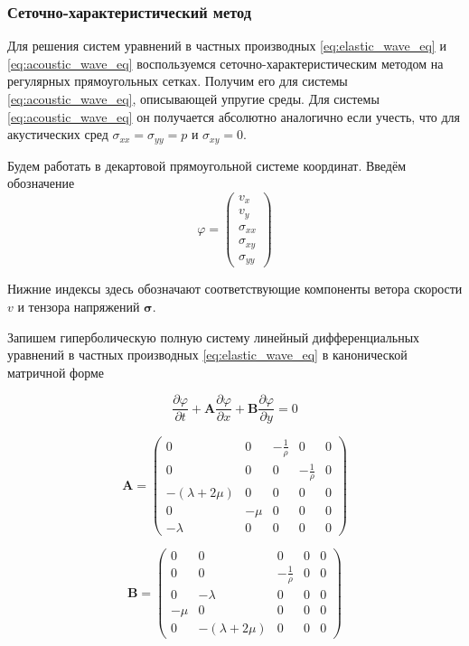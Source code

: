 \subsubsection{Сеточно-характеристический метод}

Для решения систем уравнений в частных производных \eqref{eq:elastic_wave_eq} и \eqref{eq:acoustic_wave_eq} воспользуемся сеточно-характеристическим методом на регулярных прямоугольных сетках. Получим его для системы \eqref{eq:acoustic_wave_eq}, описывающей упругие среды. Для системы \eqref{eq:acoustic_wave_eq} он получается абсолютно аналогично если учесть, что для акустических сред $\sigma_{xx} = \sigma_{yy} = p$ и $\sigma_{xy}=0$.

Будем работать в декартовой прямоугольной системе координат. Введём обозначение 
\begin{equation}
    \varphi = \begin{pmatrix} v_x \\ v_y \\ \sigma_{xx} \\ \sigma_{xy} \\ \sigma_{yy} \end{pmatrix}
\end{equation}

Нижние индексы здесь обозначают соответствующие компоненты ветора скорости $v$ и тензора напряжений $\pmb{\sigma}$.

Запишем гиперболическую полную систему линейный дифференциальных уравнений в частных производных \eqref{eq:elastic_wave_eq} в канонической матричной форме

\begin{equation}
    \dfrac{\partial \varphi}{\partial t} + 
    \pmb{A} \dfrac{\partial \varphi}{\partial x} + 
    \pmb{B} \dfrac{\partial \varphi}{\partial y} = 0
\end{equation}

\begin{equation}
    \pmb{A} = \begin{pmatrix}
        0 & 0 & -\frac{1}{\rho} & 0 & 0 \\
        0 & 0 & 0 & -\frac{1}{\rho} & 0 \\
        -(\lambda+2\mu) & 0 & 0 & 0 & 0 \\
        0 & -\mu & 0 & 0 & 0 \\
        -\lambda & 0 & 0 & 0 & 0
    \end{pmatrix}
\end{equation}

\begin{equation}
    \pmb{B} = \begin{pmatrix}
        0 & 0 & 0 & 0 & 0 \\
        0 & 0 & -\frac{1}{\rho} & 0 & 0 \\
        0 & -\lambda & 0 & 0 & 0 \\
        -\mu & 0 & 0 & 0 & 0 \\
        0 & -(\lambda+2\mu) & 0 & 0 & 0
    \end{pmatrix}
\end{equation}

